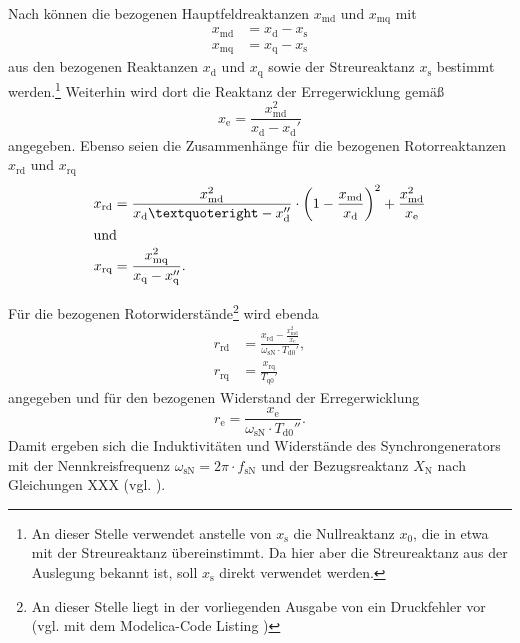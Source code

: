 Nach \cite[S. 264]{kralModelicaObjektorientierteModellbildung2019}
können die bezogenen Hauptfeldreaktanzen \(x_{\mathrm{md}}\) und
\(x_{\mathrm{mq}}\) mit \begin{align}
x_{\mathrm{md}} &= x_{\mathrm{d}} - x_{\mathrm{s}} \\
x_{\mathrm{mq}} &= x_{\mathrm{q}} - x_{\mathrm{s}}
\end{align} aus den bezogenen Reaktanzen \(x_{\mathrm{d}}\) und
\(x_{\mathrm{q}}\) sowie der Streureaktanz \(x_{\mathrm{s}}\) bestimmt
werden.\footnote{An dieser Stelle verwendet
  \cite[]{kralModelicaObjektorientierteModellbildung2019} anstelle von
  \(x_{\mathrm{s}}\) die Nullreaktanz \(x_{\mathrm{0}}\), die in etwa
  mit der Streureaktanz übereinstimmt. Da hier aber die Streureaktanz
  aus der Auslegung bekannt ist, soll \(x_{\mathrm{s}}\) direkt
  verwendet werden.} Weiterhin wird dort die Reaktanz der
Erregerwicklung gemäß \[
x_{\mathrm{e}} = \frac{x_{\mathrm{md}}^2}{x_{\mathrm{d}}-x_{\mathrm{d}}'}
\]angegeben. Ebenso seien die Zusammenhänge für die bezogenen
Rotorreaktanzen \(x_{\mathrm{rd}}\) und \(x_{\mathrm{rq}}\)
\begin{align}
x_{\mathrm{rd}} &= \frac{x_{\mathrm{md}}^2}{x_{\mathrm{d}}’ - x_{\mathrm{d}}''}\cdot \left( 1-\frac{x_{\mathrm{md}}}{x_{\mathrm{d}}}\right)^2 + \frac{x_{\mathrm{md}}^2}{x_{\mathrm{e}}}\\
\intertext{und}
x_{\mathrm{rq}} &= \frac{x_{\mathrm{mq}}^2}{x_{\mathrm{q}} - x_{\mathrm{q}}''}.
\end{align}

Für die bezogenen Rotorwiderstände\footnote{An dieser Stelle liegt in
  der vorliegenden Ausgabe von
  \cite[]{kralModelicaObjektorientierteModellbildung2019} ein
  Druckfehler vor (vgl. mit dem Modelica-Code Listing
  \cite[S. 266]{kralModelicaObjektorientierteModellbildung2019})} wird
ebenda \begin{align}
r_{\mathrm{rd}} &= \frac{x_{\mathrm{rd}} - \frac{x_{\mathrm{md}}^2}{x_{\mathrm{e}}}}{\omega_{\mathrm{sN}}\cdot T_{\mathrm{d0}}'}, \\
r_{\mathrm{rq}} &= \frac{x_{\mathrm{rq}}}{T_{\mathrm{q0}}'}
\end{align} angegeben und für den bezogenen Widerstand der
Erregerwicklung\[
r_{\mathrm{e}} = \frac{x_{\mathrm{e}}}{\omega_{\mathrm{sN}}\cdot T_{\mathrm{d0}}''}.
\] Damit ergeben sich die Induktivitäten und Widerstände des
Synchrongenerators mit der Nennkreisfrequenz
\(\omega_{\mathrm{sN}}=2\pi\cdot f_{\mathrm{sN}}\) und der
Bezugsreaktanz \(X_{\mathrm{N}}\) nach Gleichungen XXX (vgl.
\cite[S.265f.]{kralModelicaObjektorientierteModellbildung2019}).

